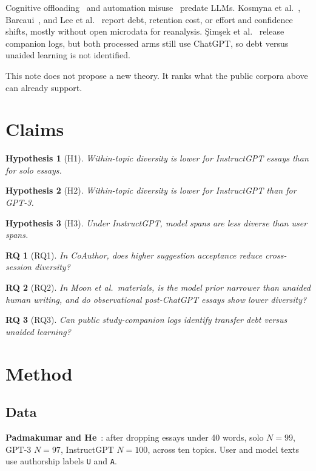 \documentclass[11pt]{article}
\newtheorem{hypothesis}{Hypothesis}
\newtheorem{researchquestion}{RQ}
\begin{document}
Cognitive offloading~\citep{risko2016offloading} and automation misuse~\citep{parasuraman1997automation} predate LLMs.
Kosmyna et al.~\citep{kosmyna2025eeg}, Barcaui~\citep{barcaui2025crutch}, and Lee et al.~\citep{lee2025critical} report debt, retention cost, or effort and confidence shifts, mostly without open microdata for reanalysis.
{\c{S}}im{\c{s}}ek et al.~\citep{simsek2025companion,osfswytk2025} release companion logs, but both processed arms still use ChatGPT, so debt versus unaided learning is not identified.

This note does not propose a new theory.
It ranks what the public corpora above can already support.

\section{Claims}

\begin{hypothesis}[H1]
Within-topic diversity is lower for InstructGPT essays than for solo essays.
\end{hypothesis}
\begin{hypothesis}[H2]
Within-topic diversity is lower for InstructGPT than for GPT-3.
\end{hypothesis}
\begin{hypothesis}[H3]
Under InstructGPT, model spans are less diverse than user spans.
\end{hypothesis}

\begin{researchquestion}[RQ1]
In CoAuthor, does higher suggestion acceptance reduce cross-session diversity?
\end{researchquestion}
\begin{researchquestion}[RQ2]
In Moon et al.\ materials, is the model prior narrower than unaided human writing, and do observational post-ChatGPT essays show lower diversity?
\end{researchquestion}
\begin{researchquestion}[RQ3]
Can public study-companion logs identify transfer debt versus unaided learning?
\end{researchquestion}

\section{Method}

\subsection{Data}
\textbf{Padmakumar and He}~\citep{padmakumar2024diversity}: after dropping essays under 40 words, solo $N=99$, GPT-3 $N=97$, InstructGPT $N=100$, across ten topics.
User and model texts use authorship labels \texttt{U} and \texttt{A}.
\end{document}
